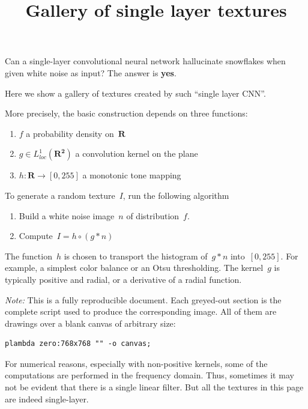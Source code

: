 \title{Gallery of single layer textures}

Can a single-layer convolutional neural network hallucinate snowflakes when
given white noise as input?  The answer is {\bf yes}.

Here we show a gallery of textures created by such ``single layer CNN''.

More precisely,
the basic construction depends on three functions:
\begin{enumerate}
	\item $f$ a probability density on~$\mathbf{R}$
	\item $g\in L^1_{loc}(\mathbf{R^2})$ a convolution kernel on the plane
	\item $h:\mathbf{R}\to[0,255]$ a monotonic tone mapping
\end{enumerate}
To generate a random texture~$I$, run the following algorithm
\begin{enumerate}
	\item Build a white noise image~$n$ of distribution~$f$.
	\item Compute~$I=h\circ (g*n)$
\end{enumerate}
The function~$h$ is chosen to transport the histogram of~$g*n$
into~$[0,255]$.  For example, a simplest color balance or an Otsu
thresholding.  The kernel~$g$ is typically positive and radial, or a
derivative of a radial function.


\emph{Note:}
This is a fully reproducible document.
Each greyed-out section is the complete script used to produce the
corresponding image.  All of them are drawings over a blank canvas of
arbitrary size:

\begin{verbatim}
plambda zero:768x768 "" -o canvas;
\end{verbatim}

For numerical reasons, especially with non-positive kernels, some of the
computations are performed in the frequency domain.  Thus, sometimes it may
not be evident that there is a single linear filter.  But all the textures in
this page are indeed single-layer.

